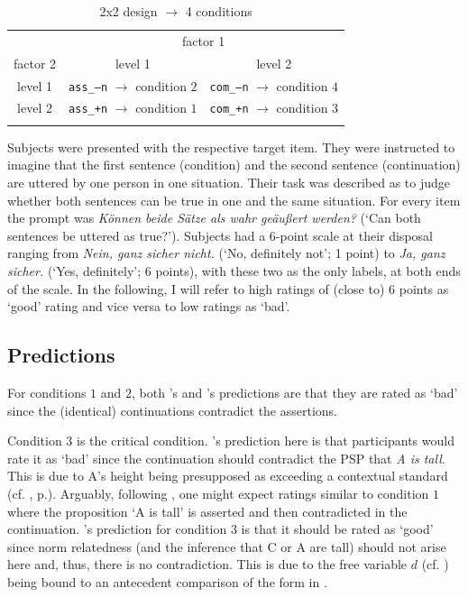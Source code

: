 \documentclass[output=paper,
modfonts
]{langscibook}
\begin{document}
\begin{table}
\begin{tabular}{ccc}
\lsptoprule                     
         & \multicolumn{2}{c}{factor 1}\\\cmidrule(lr){2-3}
factor 2 & level 1 & level 2 \\
\midrule
level 1 & \texttt{ass\_--n} $\rightarrow$ condition $2$ & \texttt{com\_--n} $\rightarrow$ condition $4$ \\
level 2 & \texttt{ass\_+n} $\rightarrow$ condition $1$ & \texttt{com\_+n} $\rightarrow$ condition $3$ \\
\lspbottomrule
\end{tabular}
\caption{2x2 design $\rightarrow$ 4 conditions}
\label{tab:factors_levels_conds}
\end{table}

\noindent Subjects were presented with the respective target item. They were instructed to imagine that the first sentence (condition) and the second sentence (continuation) are uttered by one person in one situation. Their task was described as to judge whether both sentences can be true in one and the same situation. For every item the prompt was \textit{Können beide Sätze als wahr geäußert werden?} (`Can both sentences be uttered as true?'). Subjects had a 6-point scale at their disposal ranging from \textit{Nein, ganz sicher nicht.} (`No, definitely not'; 1 point) to \textit{Ja, ganz sicher.} (`Yes, definitely'; 6 points), with these two as the only labels, at both ends of the scale. In the following, I will refer to high ratings of (close to) 6 points as `good' rating and vice versa to low ratings as `bad'.

\subsection{Predictions}
For conditions $1$ and $2$, both \citeauthor{Hofstetter2013}'s and \citeauthor{umbach2009a_comp}'s predictions are that they are rated as `bad' since the (identical) continuations contradict the assertions. 

Condition $3$ is the critical condition. \citeauthor{Hofstetter2013}'s prediction here is that participants would rate it as `bad' since the continuation should contradict the PSP that \textit{A is tall}. This is due to A's height being presupposed as exceeding a contextual standard (cf. , p.\pageref{HS_entry_comp}). Arguably, following \citeauthor{Hofstetter2013}, one might expect ratings similar to condition $1$ where the proposition `A is tall' is asserted and then contradicted in the continuation. \citeauthor{umbach2009a_comp}'s prediction for condition $3$ is that it should be rated as `good' since norm relatedness (and the inference that C or A are tall) should not arise here and, thus, there is no contradiction. This is due to the free variable $d$ (cf. ) being bound to an antecedent comparison of the form in .
\end{document}
